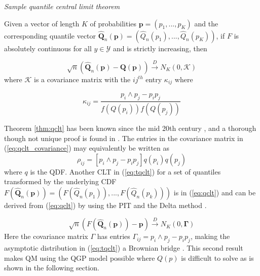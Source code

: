\documentclass[preprint,12pt,authoryear]{elsarticle}
\begin{document}
\begin{theorem}{\emph{Sample quantile central limit theorem}}
\label{thm:qclt}

Given a vector of length $K$ of probabilities $\boldsymbol{p} = (p_1, ..., p_K)$ and the corresponding quantile vector $\hat{\boldsymbol{Q}}_n(\boldsymbol{p}) = (\hat{Q}_n(p_1), ..., \hat{Q}_n(p_K))$, if $F$ is absolutely continuous for all $y \in \mathcal{Y}$ and is strictly increasing, then

\begin{equation}
    \label{eq:qclt}
    \sqrt{n}(\hat{\boldsymbol{Q}}_n(\boldsymbol{p}) - \boldsymbol{Q}(\boldsymbol{p})) \overset{D}{\rightarrow} N_K(0, \boldsymbol{\mathcal{K}})
\end{equation}
where $\boldsymbol{\mathcal{K}}$ is a covariance matrix with the $ij^{th}$ entry $\kappa_{ij}$ where

\begin{equation}
    \label{eq:qclt_covariance}
    \kappa_{ij} = \frac{p_i \wedge p_j - p_i p_j}{f(Q(p_i)) f(Q(p_j))}
\end{equation}
\end{theorem}

Theorem \ref{thm:qclt} has been known since the mid 20th century \cite[]{cramer1951mathematical}, and a thorough though not unique proof is found in \cite{walker1968note}. The entries in the covariance matrix in (\ref{eq:qclt_covariance}) may equivalently be written as
\begin{equation}
    \rho_{ij} = [p_i \wedge p_j - p_i p_j]q(p_i)q(p_j)
    \label{eq:qgp_simp_cov}
\end{equation}
where $q$ is the QDF. Another CLT in (\ref{eq:tqclt}) for a set of quantiles transformed by the underlying CDF $F(\hat{\boldsymbol{Q}}_n(\boldsymbol{p})) = (F(\hat{Q}_n(p_1)), ..., F(\hat{Q}_n(p_k)))$ is in (\ref{eq:qclt}) and can be derived from (\ref{eq:qclt}) by using the PIT and the Delta method \cite[]{parzen2004quantile}.

\begin{equation}
    \label{eq:tqclt}
    \sqrt{n}(F(\hat{\boldsymbol{Q}}_n(\boldsymbol{p})) - \boldsymbol{p}) \overset{D}{\rightarrow} N_K(0, \boldsymbol{\Gamma})
\end{equation}
Here the covariance matrix $\Gamma$ has entries $\Gamma_{ij} = p_i \wedge p_j - p_i p_j$, making the asymptotic distribution in (\ref{eq:tqclt}) a Brownian bridge \cite[]{chow2009brownian}. This second result makes QM using the QGP model possible where $Q(p)$ is difficult to solve as is shown in the following section.
\end{document}
